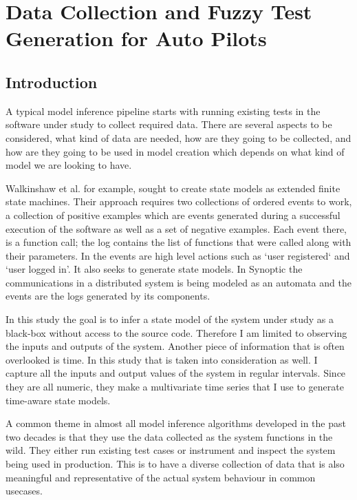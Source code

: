 
\chapter{Data Collection and Fuzzy Test Generation for Auto Pilots}

% 
% 
% 
% 


\section{Introduction}
A typical model inference pipeline starts with running existing tests in the software under study to collect required data. \cite{Papadopoulos2015} There are several aspects to be considered, what kind of data are needed, how are they going to be collected, and how are they going to be used in model creation which depends on what kind of model we are looking to have. 

Walkinshaw et al. for example, \cite{walkinshaw2016inferring} sought to create state models as extended finite state machines. Their approach requires two collections of ordered events to work, a collection of positive examples which are events generated during a successful execution of the software as well as a set of negative examples. Each event there, is a function call; the log contains the list of functions that were called along with their parameters. 
In \cite{howar2012inferring} the events are high level actions such as `user registered` and `user logged in'. It also seeks to generate state models.
In Synoptic \cite{schneider2010synoptic} the communications in a distributed system is being modeled as an automata and the events are the logs generated by its components.


In this study the goal is to infer a state model of the system under study as a black-box without access to the source code. Therefore I am limited to observing the inputs and outputs of the system. Another piece of information that is often overlooked is time. In this study that is taken into consideration as well. I capture all the inputs and output values of the system in regular intervals. Since they are all numeric, they make a multivariate time series that I use to generate time-aware state models. 


A common theme in almost all model inference algorithms developed in the past two decades is that they use the data collected as the system functions in the wild. They either run existing test cases or instrument and inspect the system being used in production. 
This is to have a diverse collection of data that is also meaningful and representative of the actual system behaviour in common usecases.

